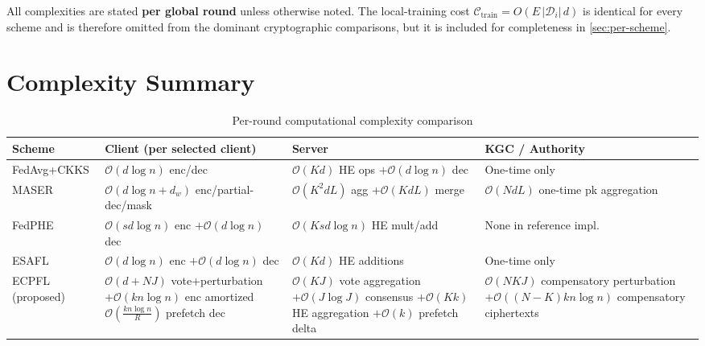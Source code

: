 \documentclass[a4paper,11pt]{article}
\begin{document}
All complexities are stated \textbf{per global round} unless otherwise noted. The local-training cost $\mathcal{C}_{\text{train}}=O(E\,|\mathcal{D}_i|\,d)$ is identical for every scheme and is therefore omitted from the dominant cryptographic comparisons, but it is included for completeness in \cref{sec:per-scheme}.

\section{Complexity Summary}
\label{sec:summary}

\begin{table}
\centering
\caption{Per-round computational complexity comparison}
\label{tab:complexity-summary}
\renewcommand{\arraystretch}{1.25}
\small
\begin{tabularx}{\textheight}{|l|X|X|X|}
\hline
\textbf{Scheme} & \textbf{Client (per selected client)} & \textbf{Server} & \textbf{KGC / Authority} \\
\hline
FedAvg+CKKS & $\mathcal{O}(d\log n)$ enc/dec & $\mathcal{O}(Kd)$ HE ops $+\mathcal{O}(d\log n)$ dec & One-time only \\
\hline
MASER & $\mathcal{O}(d\log n + d_w)$ enc/partial-dec/mask & $\mathcal{O}(K^2 d L)$ agg $+\mathcal{O}(KdL)$ merge & $\mathcal{O}(NdL)$ one-time pk aggregation \\
\hline
FedPHE & $\mathcal{O}(sd\log n)$ enc $+\mathcal{O}(d\log n)$ dec & $\mathcal{O}(Ksd\log n)$ HE mult/add & None in reference impl. \\
\hline
ESAFL & $\mathcal{O}(d\log n)$ enc $+\mathcal{O}(d\log n)$ dec & $\mathcal{O}(Kd)$ HE additions & One-time only \\
\hline
ECPFL (proposed) & 
\makecell[l]{$\mathcal{O}(d+NJ)$ vote+perturbation \\ $+\mathcal{O}(k n\log n)$ enc \\ amortized $\mathcal{O}(\frac{k n\log n}{R})$ prefetch dec}
&
\makecell[l]{$\mathcal{O}(KJ)$ vote aggregation \\ $+\mathcal{O}(J\log J)$ consensus \\ $+\mathcal{O}(Kk)$ HE aggregation \\ $+\mathcal{O}(k)$ prefetch delta}
&
\makecell[l]{$\mathcal{O}(NKJ)$ compensatory perturbation \\ $+\mathcal{O}((N-K)k n\log n)$ \\ compensatory ciphertexts}
\\
\hline
\end{tabularx}
\end{table}
\end{document}

